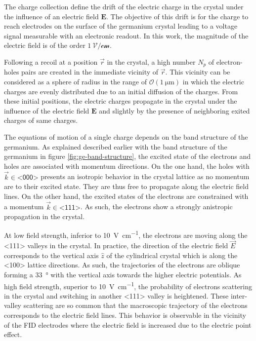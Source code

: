 The charge collection define the drift of the electric charge in the crystal under the influence of an electric field $\bm{E}$. The objective of this drift is for the charge to reach electrodes on the surface of the germanium crystal leading to a voltage signal measurable with an electronic readout. In this work, the magnitude of the electric field is of the order $\mathcal{\SI{1}{\volt\per\cm}}$. 

Following a recoil at a position $\vec{r}$ in the crystal, a high number $N_p$ of electron-holes pairs are created in the immediate vicinity of $\vec{r}$. This vicinity can be considered as a sphere of radius in the range of $\mathcal{O}(\SI{1}{\micro\m})$ in which the electric charges are evenly distributed due to an initial diffusion of the charges. From these initial positions, the electric charges propagate in the crystal under the influence of the electric field $\bm{E}$ and slightly by the presence of neighboring exited charges of same charges. 

The equations of motion of a single charge depends on the band structure of the germanium. As explained described earlier with the band structure of the germanium in figure \ref{fig:ge-band-structure}, the excited state of the electrons and holes are associated with momentum directions. On the one hand, the holes with $\vec{k} \in \textsf{<000>}$ presents an isotropic behavior in the crystal lattice as no momentum are to their excited state. They are thus free to propagate along the electric field lines. On the other hand, the excited states of the electrons are constrained with a momentum $\vec{k} \in \textsf{<111>}$. As such, the electrons show a strongly anistropic propagation in the crystal.

At low field strength, inferior to \SI{10}{\volt\per\cm}, the electrons are moving along the <111> valleys in the crystal. In practice, the direction of the electric field $\vec{E}$ corresponds to the vertical axis $\hat{z}$ of the cylindrical crystal which is along the <100> lattice directions. As such, the trajectories of the electrons are oblique forming a \SI{33}{\degree} with the vertical axis towards the higher electric potentials.
As high field strength, superior to \SI{10}{\volt\per\cm}, the probability of electrons scattering in the crystal and switching in another <111> valley is heightened. These inter-valley scattering are so common that the macroscopic trajectory of the electrons corresponds to the electric field lines. This behavior is observable in the vicinity of the FID electrodes where the electric field is increased due to the electric point effect.

